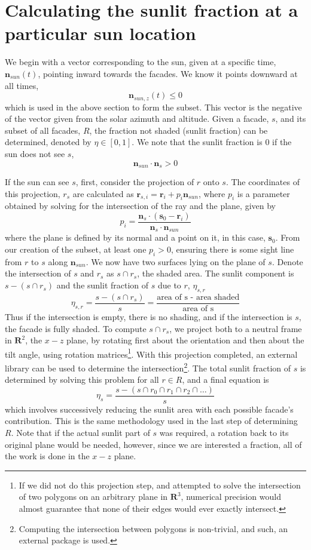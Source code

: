 \documentclass[11pt]{article}
\begin{document}
\section{Calculating the sunlit fraction at a particular sun location}
We begin with a vector corresponding to the sun, given at a specific time, $\mathbf{n}_{sun}(t)$, pointing inward towards the facades. We know it points downward at all times, 
\[
  \mathbf{n}_{sun,z}(t) \leq 0
\]
which is used in the above section to form the subset. This vector is the negative of the vector given from the solar azimuth and altitude. Given a facade, $s$, and its subset of all facades, $R$, the fraction not shaded (sunlit fraction) can be determined, denoted by $\eta \in [0,1]$. We note that the sunlit fraction is 0 if the sun does not see $s$,
\[ \mathbf{n}_{sun}\cdot \mathbf{n}_s  > 0\]

If the sun can see $s$, first, consider the projection of $r$ onto $s$. 
The coordinates of this projection, $r_{s}$ are calculated as $\mathbf{r}_{s,i} = \mathbf{r}_i+p_i\mathbf{n}_{sun}$, where $p_i$ is a parameter obtained by solving for the intersection of the ray and the plane, given by
\[
p_i = \frac{\mathbf{n}_s\cdot (\mathbf{s}_0-\mathbf{r}_i)}{\mathbf{n}_s\cdot \mathbf{n}_{sun}}
\]
where the plane is defined by its normal and a point on it, in this case, $\mathbf{s}_0$. From our creation of the subset, at least one $p_i > 0$, ensuring there is some sight line from $r$ to $s$ along $\mathbf{n}_{sun}$. We now have two surfaces lying on the plane of $s$. Denote the intersection of $s$ and $r_{s}$ as $s \cap r_{s}$, the shaded area. The sunlit component is $s-(s \cap r_{s})$ and the sunlit fraction of $s$ due to $r$, $\eta_{s,r}$
\[
\eta_{s,r} = \frac{s-(s \cap r_{s})}{s} = \frac{\text{area of s - area shaded}}{\text{area of s}}
\]
Thus if the intersection is empty, there is no shading, and if the intersection is $s$, the facade is fully shaded. To compute $s \cap r_{s}$, we project both to a neutral frame in $\mathbf{R}^2$, the $x-z$ plane, by rotating first about the orientation and then about the tilt angle, using rotation matrices\footnote{If we did not do this projection step, and attempted to solve the intersection of two polygons on an arbitrary plane in $\mathbf{R}^3$, numerical precision would almost guarantee that none of their edges would ever exactly intersect.}. With this projection completed, an external library can be used to determine the intersection\footnote{Computing the intersection between polygons is non-trivial, and such, an external package is used.}. The total sunlit fraction of $s$ is determined by solving this problem for all $r \in R$, and a final equation is
\[
\eta_{s} = \frac{s-(s \cap r_{0}\cap r_{1} \cap r_{2} \cap \ldots) }{s}
\]
which involves successively reducing the sunlit area with each possible facade's contribution. This is the same methodology used in the last step of determining $R$. Note that if the actual sunlit part of $s$ was required, a rotation back to its original plane would be needed, however, since we are interested a fraction, all of the work is done in the $x-z$ plane.
\end{document}
